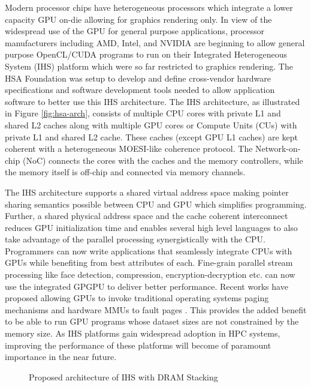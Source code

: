 \par Modern processor chips have heterogeneous processors which integrate a lower capacity GPU on-die allowing for graphics rendering only. In view of the widespread use of the GPU for general purpose applications, processor manufacturers including AMD\cite{amd-apu}, Intel\cite{inteliris}, and NVIDIA\cite{denver} are beginning to allow general purpose OpenCL\cite{opencl}/CUDA\cite{cuda} programs to run on their Integrated Heterogeneous System (IHS) platform which were so far restricted to graphics rendering. The HSA Foundation \cite{hsafoundation} was setup to develop and define cross-vendor hardware specifications and software development tools needed to allow application software to better use this IHS architecture. 
The IHS architecture, as illustrated in Figure \ref{fig:hsa-arch}, consists of multiple CPU cores with private L1 and shared L2 caches along with multiple GPU cores or Compute Units (CUs) with private L1 and shared L2 cache. These caches (except GPU L1 caches) are kept coherent with a heterogeneous MOESI-like coherence protocol. The Network-on-chip (NoC) connects the cores with the caches and the memory controllers, while the memory itself is off-chip and connected via memory channels. 
\par The IHS architecture supports a shared virtual address space making pointer sharing semantics possible between CPU and GPU which simplifies programming. Further, a shared physical address space and the cache coherent interconnect reduces GPU initialization time and enables several high level languages \cite{sumatra,julia} to also take advantage of the parallel processing synergistically with the CPU. Programmers can now write applications that seamlessly integrate CPUs with GPUs while benefiting from best attributes of each. Fine-grain parallel stream processing like face detection, compression, encryption-decryption etc. can now use the integrated GPGPU to deliver better performance. Recent works have proposed allowing GPUs to invoke traditional operating systems paging mechanisms and hardware MMUs to fault pages \cite{tlb-translation}. This provides the added benefit to be able to run GPU programs whose dataset sizes are not constrained by the memory size. As IHS platforms gain widespread adoption in HPC systems, improving the performance of these platforms will become of paramount importance in the near future. \cite{apu-exascale,amd-exascale1}

\begin{figure}[!htb]
    \centering
    \def\svgwidth{\columnwidth}
    
    \caption{Proposed architecture of IHS with DRAM Stacking}
    \label{fig:stackdram}
\end{figure}

